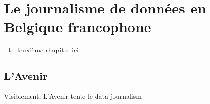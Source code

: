 
\chapter{Le journalisme de données en Belgique francophone}

- le deuxième chapitre ici -

\section{L'Avenir}

Visiblement, L'Avenir tente le data journalism
